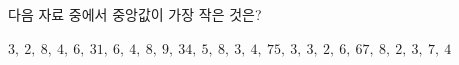 다음 자료 중에서 중앙값이 가장 작은 것은?
\begin{choicesii}{$3,\ 2,\ 8,\ 4,\ 6,\ 3$}{$1,\ 6,\ 4,\ 8,\ 9,\ 3$}{$4,\ 5,\ 8,\ 3,\ 4,\ 7$}{$5,\ 3,\ 3,\ 2,\ 6,\ 6$}{$7,\ 8,\ 2,\ 3,\ 7,\ 4$}\end{choicesii}
